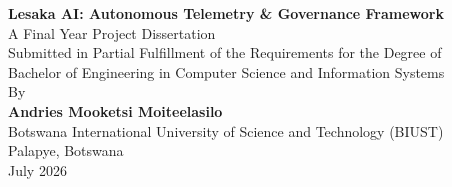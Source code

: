 
\begin{titlepage}
    \centering
    \vspace*{2cm}
    
    {\Huge \textbf{Lesaka AI: Autonomous Telemetry \& Governance Framework}}\\[2cm]
    
    {\Large A Final Year Project Dissertation}\\[1cm]
    
    {\large Submitted in Partial Fulfillment of the Requirements for the Degree of}\\[0.5cm]
    
    {\large Bachelor of Engineering in Computer Science and Information Systems}\\[2cm]
    
    {\large By}\\[0.5cm]
    
    {\large \textbf{Andries Mooketsi Moiteelasilo}}\\[1cm]
    
    {\large Botswana International University of Science and Technology (BIUST)}\\[0.5cm]
    
    {\large Palapye, Botswana}\\[2cm]
    
    {\large July 2026}
    
    \vspace*{2cm}
\end{titlepage}
